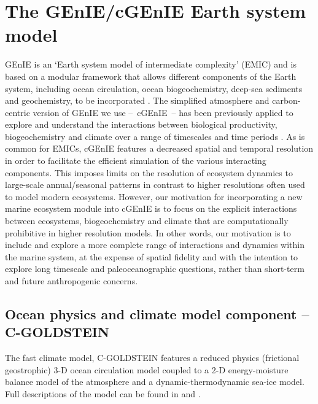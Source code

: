 \documentclass[gmd, manuscript]{copernicus}
\begin{document}
\section{The GEnIE/cGEnIE Earth system model}\label{GEnIE}
GEnIE is an `Earth system model of intermediate complexity' (EMIC) \citep{Claussen:2002} and is based on a modular framework that allows different components of the Earth system, including ocean circulation, ocean biogeochemistry, deep-sea sediments and geochemistry, to be incorporated \citep{Lenton:2007b}. The simplified atmosphere and carbon-centric version of GEnIE we use --~cGEnIE~-- has been previously applied to explore and understand the interactions between biological productivity, biogeochemistry and climate over a range of timescales and time periods \citep[e.g.,][]{Ridgwell:2010,Monteiro:2012,Norris:2013,John:2014,Gibbs:2015,Meyer:2016,Tagliabue:2016}.  As is common for EMICs, cGEnIE features a decreased spatial and temporal resolution in order to facilitate the efficient simulation of the various interacting components. This imposes limits on the resolution of ecosystem dynamics to large-scale annual/seasonal patterns in contrast to higher resolutions often used to model modern ecosystems. However, our motivation for incorporating a new marine ecosystem module into cGEnIE is to focus on the explicit interactions between ecosystems, biogeochemistry and climate that are computationally prohibitive in higher resolution models. In other words, our motivation is to include and explore a more complete range of interactions and dynamics within the marine system, at the expense of spatial fidelity and with the intention to explore long timescale and paleoceanographic questions, rather than short-term and future anthropogenic concerns. 

\subsection{Ocean physics and climate model component -- C-GOLDSTEIN}
The fast climate model, C-GOLDSTEIN features a reduced physics (frictional geostrophic) 3-D ocean circulation model coupled to a 2-D energy-moisture balance model of the atmosphere and a dynamic-thermodynamic sea-ice model.  Full descriptions of the model can be found in \citet{EdwardsMarsh:2005} and \citet{Marsh:2011}. 
\end{document}
